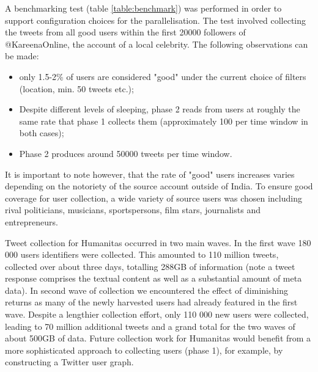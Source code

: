 A benchmarking test (table \ref{table:benchmark}) was performed in order to support configuration choices for the parallelisation. The test involved collecting the tweets from all good users within the first 20000 followers of @KareenaOnline, the account of a local celebrity. The following observations can be made:

\begin{itemize}
\item only 1.5-2\% of users are considered "good" under the current choice of filters (location, min. 50 tweets etc.);
\item Despite different levels of sleeping, phase 2 reads from users at roughly the same rate that phase 1 collects them (approximately 100 per time window in both cases);
\item Phase 2 produces around 50000 tweets per time window.
\end{itemize}

It is important to note however, that the rate of "good" users increases varies depending on the notoriety of the source account outside of India. To ensure good coverage for user collection, a wide variety of source users was chosen including rival politicians, musicians, sportspersons, film stars, journalists and entrepreneurs.

Tweet collection for Humanitas occurred in two main waves. In the first wave 180 000 users identifiers were collected. This amounted to 110 million tweets, collected over about three days, totalling 288GB of information (note a tweet response comprises the textual content as well as a substantial amount of meta data). In second wave of collection we encountered the effect of diminishing returns as many of the newly harvested users had already featured in the first wave. Despite a lengthier collection effort, only 110 000 new users were collected, leading to 70 million additional tweets and a grand total for the two waves of about 500GB of data. Future collection work for Humanitas would benefit from a more sophisticated approach to collecting users (phase 1), for example, by constructing a Twitter user graph.

